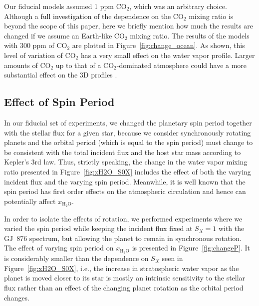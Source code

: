\documentclass[11pt,numberedappendix,twocolappendix,]{emulateapj}
\def\water{H$_2$O}
\def\xwater{$x_\text{\water}$}
\def\wv{water vapor}
\begin{document}
Our fiducial models assumed 1 ppm CO$_2$, which was an arbitrary choice. 
Although a full investigation of the dependence on the CO$_2$ mixing ratio is beyond the scope of this paper, here we briefly mention how much the results are changed if we assume an Earth-like CO$_2$ mixing ratio. 
The results of the models with 300 ppm of CO$_2$ are plotted in Figure~\ref{fig:change_ocean}. 
As shown, this level of variation of CO$_2$ has a very small effect on the \wv{} profile. 
Larger amounts of CO$_2$ up to that of a CO$_2$-dominated atmosphere could have a more substantial effect on the 3D profiles \citep{Wordsworth2013}. 


\subsection{Effect of Spin Period}
\label{ss:sensitivity_Porbit}

In our fiducial set of experiments, we changed the planetary spin period together with the stellar flux for a given star, because we consider synchronously rotating planets and the orbital period (which is equal to the spin period) must change to be consistent with the total incident flux and the host star mass according to Kepler's 3rd law. 
Thus, strictly speaking, the change in the \wv{} mixing ratio presented in Figure~\ref{fig:xH2O_S0X} includes the effect of both the varying incident flux and the varying spin period. 
Meanwhile, it is well known that the spin period has first order effects on the atmospheric circulation and hence can potentially affect \xwater{}. 

In order to isolate the effects of rotation, we performed experiments where we varied the spin period while keeping the incident flux fixed at $S_X=1$ with the GJ~876 spectrum, but allowing the planet to remain in synchronous rotation. 
The effect of varying spin period on \xwater{} is presented in Figure~\ref{fig:changeP}. 
It is considerably smaller than the dependence on $S_X$ seen in Figure~\ref{fig:xH2O_S0X}, i.e., the increase in stratospheric water vapor as the planet is moved closer to its star is mostly an intrinsic sensitivity to the stellar flux rather than an effect of the changing planet rotation as the orbital period changes. 
\end{document}
